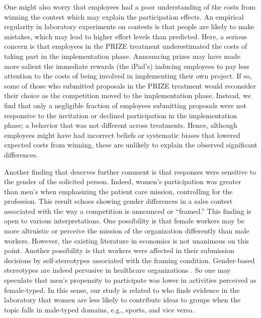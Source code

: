 \documentclass[11pt, titlepage]{article}
\begin{document}
One might also worry that employees had a poor understanding of the
costs from winning the contest which may explain the participation
effects. An empirical regularity in laboratory experiments on contests
\citep[see][]{dechenaux2014survey} is that people are likely to make
mistakes, which may lead to higher effort levels than predicted. Here, a
serious concern is that employees in the PRIZE treatment underestimated
the costs of taking part in the implementation phase. Announcing prizes
may have made more salient the immediate rewards (the iPad's) inducing
employees to pay less attention to the costs of being involved in
implementing their own project. If so, some of those who submitted
proposals in the PRIZE treatment would reconsider their choice as the
competition moved to the implementation phase. Instead, we find that
only a negligible fraction of employees submitting proposals were not
responsive to the invitation or declined participation in the
implementation phase; a behavior that was not different across
treatments. Hence, although employees might have had incorrect beliefs
or systematic biases that lowered expected costs from winning, these are
unlikely to explain the observed significant differences.

Another finding that deserves further comment is that responses were
sensitive to the gender of the solicited person. Indeed, women's
participation was greater than men's when emphasizing the patient care
mission, controlling for the profession. This result echoes
\citet{delfgaauw2013tournament} showing gender differences in a sales
contest associated with the way a competition is announced or
``framed.'' This finding is open to various interpretations. One
possibility is that female workers may be more altruistic or perceive
the mission of the organization differently than male workers. However,
the existing literature in economics \citep{croson2009gender} is not
unanimous on this point. Another possibility is that workers were
affected in their submission decisions by self-stereotypes associated
with the framing condition. Gender-based stereotypes are indeed
pervasive in healthcare organizations \citep{evans2002cautious}. So one
may speculate that men's propensity to participate was lower in
activities perceived as female-typed. In this sense, our study is
related to \citet{coffman2014evidence} who finds evidence in the
laboratory that women are less likely to contribute ideas to groups when
the topic falls in male-typed domains, e.g., sports, and vice versa.
\end{document}
